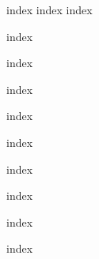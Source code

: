 \documentclass{article}
\begin{document}
{index}
{index}
{index}

\newpage


{index}

\newpage

{index}

\newpage


{index}

\newpage

{index}

\newpage

{index}

\newpage

{index}

\newpage

{index}

\newpage

{index}

\newpage

{index}
\end{document}
